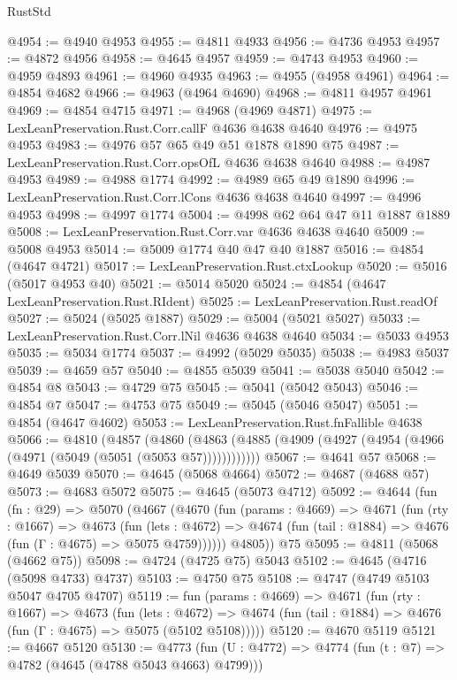 \begin{lexlean}{RustStd}
\begin{coremodule}
@4954 := @4940 @4953
@4955 := @4811 @4933
@4956 := @4736 @4953
@4957 := @4872 @4956
@4958 := @4645 @4957
@4959 := @4743 @4953
@4960 := @4959 @4893
@4961 := @4960 @4935
@4963 := @4955 (@4958 @4961)
@4964 := @4854 @4682
@4966 := @4963 (@4964 @4690)
@4968 := @4811 @4957 @4961
@4969 := @4854 @4715
@4971 := @4968 (@4969 @4871)
@4975 := LexLeanPreservation.Rust.Corr.callF @4636 @4638 @4640
@4976 := @4975 @4953
@4983 := @4976 @57 @65 @49 @51 @1878 @1890 @75
@4987 := LexLeanPreservation.Rust.Corr.opsOfL @4636 @4638 @4640
@4988 := @4987 @4953
@4989 := @4988 @1774
@4992 := @4989 @65 @49 @1890
@4996 := LexLeanPreservation.Rust.Corr.lCons @4636 @4638 @4640
@4997 := @4996 @4953
@4998 := @4997 @1774
@5004 := @4998 @62 @64 @47 @11 @1887 @1889
@5008 := LexLeanPreservation.Rust.Corr.var @4636 @4638 @4640
@5009 := @5008 @4953
@5014 := @5009 @1774 @40 @47 @40 @1887
@5016 := @4854 (@4647 @4721)
@5017 := LexLeanPreservation.Rust.ctxLookup
@5020 := @5016 (@5017 @4953 @40)
@5021 := @5014 @5020
@5024 := @4854 (@4647 LexLeanPreservation.Rust.RIdent)
@5025 := LexLeanPreservation.Rust.readOf
@5027 := @5024 (@5025 @1887)
@5029 := @5004 (@5021 @5027)
@5033 := LexLeanPreservation.Rust.Corr.lNil @4636 @4638 @4640
@5034 := @5033 @4953
@5035 := @5034 @1774
@5037 := @4992 (@5029 @5035)
@5038 := @4983 @5037
@5039 := @4659 @57
@5040 := @4855 @5039
@5041 := @5038 @5040
@5042 := @4854 @8
@5043 := @4729 @75
@5045 := @5041 (@5042 @5043)
@5046 := @4854 @7
@5047 := @4753 @75
@5049 := @5045 (@5046 @5047)
@5051 := @4854 (@4647 @4602)
@5053 := LexLeanPreservation.Rust.fnFallible @4638
@5066 := @4810
    (@4857
      (@4860 (@4863 (@4885 (@4909 (@4927 (@4954 (@4966 (@4971 (@5049 (@5051 (@5053 @57))))))))))))
@5067 := @4641 @57
@5068 := @4649 @5039
@5070 := @4645 (@5068 @4664)
@5072 := @4687 (@4688 @57)
@5073 := @4683 @5072
@5075 := @4645 (@5073 @4712)
@5092 := @4644
    (fun (fn : @29) =>
    @5070
      (@4667
        (@4670
          (fun (params : @4669) =>
          @4671
            (fun (rty : @1667) =>
            @4673
              (fun (lets : @4672) =>
              @4674 (fun (tail : @1884) => @4676 (fun (Γ : @4675) => @5075 @4759))))))
        @4805))
    @75
@5095 := @4811 (@5068 (@4662 @75))
@5098 := @4724 (@4725 @75) @5043
@5102 := @4645 (@4716 (@5098 @4733) @4737)
@5103 := @4750 @75
@5108 := @4747 (@4749 @5103 @5047 @4705 @4707)
@5119 := fun (params : @4669) =>
  @4671
    (fun (rty : @1667) =>
    @4673
      (fun (lets : @4672) =>
      @4674 (fun (tail : @1884) => @4676 (fun (Γ : @4675) => @5075 (@5102 @5108)))))
@5120 := @4670 @5119
@5121 := @4667 @5120
@5130 := @4773 (fun (U : @4772) => @4774 (fun (t : @7) => @4782 (@4645 (@4788 @5043 @4663) @4799)))

\end{coremodule}
\end{lexlean}
